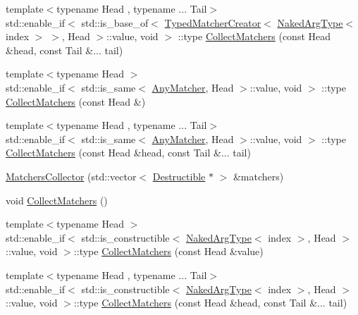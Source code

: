\begin{DoxyCompactItemize}
\item 
{\footnotesize template$<$typename Head , typename ... Tail$>$ }\\std\+::enable\+\_\+if$<$ std\+::is\+\_\+base\+\_\+of$<$ \mbox{\hyperlink{structfakeit_1_1TypedMatcherCreator}{Typed\+Matcher\+Creator}}$<$ \mbox{\hyperlink{classfakeit_1_1MatchersCollector_aeda8ced6a2f0cb7c6e4f916f18a91730}{Naked\+Arg\+Type}}$<$ index $>$ $>$, Head $>$\+::value, void $>$ \+::type \mbox{\hyperlink{classfakeit_1_1MatchersCollector_a995175e179fec18d542b109491f389ed}{Collect\+Matchers}} (const Head \&head, const Tail \&... tail)
\item 
{\footnotesize template$<$typename Head $>$ }\\std\+::enable\+\_\+if$<$ std\+::is\+\_\+same$<$ \mbox{\hyperlink{structfakeit_1_1AnyMatcher}{Any\+Matcher}}, Head $>$\+::value, void $>$ \+::type \mbox{\hyperlink{classfakeit_1_1MatchersCollector_a2abc3ce9cdbc60cd54f5864443426743}{Collect\+Matchers}} (const Head \&)
\item 
{\footnotesize template$<$typename Head , typename ... Tail$>$ }\\std\+::enable\+\_\+if$<$ std\+::is\+\_\+same$<$ \mbox{\hyperlink{structfakeit_1_1AnyMatcher}{Any\+Matcher}}, Head $>$\+::value, void $>$ \+::type \mbox{\hyperlink{classfakeit_1_1MatchersCollector_a8e7edbff22c9d33238d1e16af8f23b6f}{Collect\+Matchers}} (const Head \&head, const Tail \&... tail)
\item 
\mbox{\hyperlink{classfakeit_1_1MatchersCollector_ac5e0254e23626d189f329de8051137a6}{Matchers\+Collector}} (std\+::vector$<$ \mbox{\hyperlink{classfakeit_1_1Destructible}{Destructible}} $\ast$ $>$ \&matchers)
\item 
void \mbox{\hyperlink{classfakeit_1_1MatchersCollector_a2d9a08a347c3915daa33f307a274f13c}{Collect\+Matchers}} ()
\item 
{\footnotesize template$<$typename Head $>$ }\\std\+::enable\+\_\+if$<$ std\+::is\+\_\+constructible$<$ \mbox{\hyperlink{classfakeit_1_1MatchersCollector_aeda8ced6a2f0cb7c6e4f916f18a91730}{Naked\+Arg\+Type}}$<$ index $>$, Head $>$\+::value, void $>$\+::type \mbox{\hyperlink{classfakeit_1_1MatchersCollector_affd243a89f758239d77c70dce6318087}{Collect\+Matchers}} (const Head \&value)
\item 
{\footnotesize template$<$typename Head , typename ... Tail$>$ }\\std\+::enable\+\_\+if$<$ std\+::is\+\_\+constructible$<$ \mbox{\hyperlink{classfakeit_1_1MatchersCollector_aeda8ced6a2f0cb7c6e4f916f18a91730}{Naked\+Arg\+Type}}$<$ index $>$, Head $>$\+::value, void $>$\+::type \mbox{\hyperlink{classfakeit_1_1MatchersCollector_a29c5245d03b8fab3773455c087edde74}{Collect\+Matchers}} (const Head \&head, const Tail \&... tail)

\end{DoxyCompactItemize}

